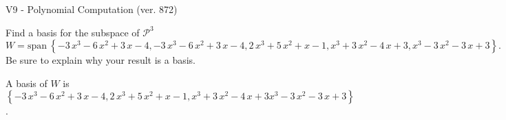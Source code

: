 \begin{exercise}
  \begin{exerciseTitle}V9 - Polynomial Computation (ver. 872)\end{exerciseTitle}
  \begin{exerciseStatement}
    Find a basis for the subspace of \(\mathcal{P}^3\) 
\[W=\mathrm{span}\ \left\{-3 \, x^{3} - 6 \, x^{2} + 3 \, x - 4 , -3 \, x^{3} - 6 \, x^{2} + 3 \, x - 4 , 2 \, x^{3} + 5 \, x^{2} + x - 1 , x^{3} + 3 \, x^{2} - 4 \, x + 3 , x^{3} - 3 \, x^{2} - 3 \, x + 3\right\}.\]
 Be sure to explain why your result is a basis.


  \end{exerciseStatement}
  \begin{exerciseAnswer}
   A basis of \(W\) is  \(\left\{-3 \, x^{3} - 6 \, x^{2} + 3 \, x - 4 , 2 \, x^{3} + 5 \, x^{2} + x - 1 , x^{3} + 3 \, x^{2} - 4 \, x + 3 x^{3} - 3 \, x^{2} - 3 \, x + 3\right\}\).
  


  \end{exerciseAnswer}
\end{exercise}